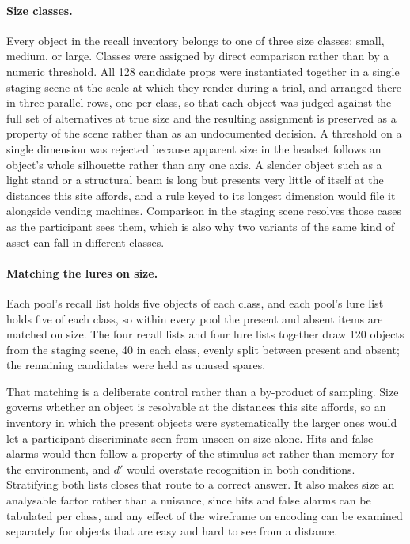 \paragraph{Size classes.} Every object in the recall inventory belongs to one
of three size classes: small, medium, or large. Classes were assigned by
direct comparison rather than by a numeric threshold. All 128 candidate props
were instantiated together in a single staging scene at the scale at which
they render during a trial, and arranged there in three parallel rows, one per
class, so that each object was judged against the full set of alternatives at
true size and the resulting assignment is preserved as a property of the scene
rather than as an undocumented decision. A threshold on a single dimension was
rejected because apparent size in the headset follows an object's whole
silhouette rather than any one axis. A slender object such as a light stand or
a structural beam is long but presents very little of itself at the distances
this site affords, and a rule keyed to its longest dimension would file it
alongside vending machines. Comparison in the staging scene resolves those
cases as the participant sees them, which is also why two variants of the same
kind of asset can fall in different classes.

\paragraph{Matching the lures on size.} Each pool's recall list holds five
objects of each class, and each pool's lure list holds five of each class, so
within every pool the present and absent items are matched on size. The four
recall lists and four lure lists together draw 120 objects from the staging
scene, 40 in each class, evenly split between present and absent; the
remaining candidates were held as unused spares.

That matching is a deliberate control rather than a by-product of sampling.
Size governs whether an object is resolvable at the distances this site
affords, so an inventory in which the present objects were systematically the
larger ones would let a participant discriminate seen from unseen on size
alone. Hits and false alarms would then follow a property of the stimulus set
rather than memory for the environment, and $d'$ would overstate recognition
in both conditions. Stratifying both lists closes that route to a correct
answer. It also makes size an analysable factor rather than a nuisance, since
hits and false alarms can be tabulated per class, and any effect of the
wireframe on encoding can be examined separately for objects that are easy and
hard to see from a distance.

